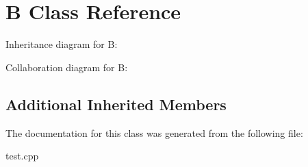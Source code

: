 \hypertarget{classB}{}\section{B Class Reference}
\label{classB}


Inheritance diagram for B\+:


Collaboration diagram for B\+:
\subsection*{Additional Inherited Members}


The documentation for this class was generated from the following file\+:\begin{DoxyCompactItemize}
\item 
test.\+cpp\end{DoxyCompactItemize}
